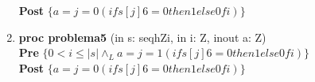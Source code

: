 \documentclass[a4paper]{article}
\begin{document}
\begin{enumerate}[label=\alph*)]
{   \hspace*{6mm} \textbf{Post }$\{a = j=0 (if s[j] 6= 0 then 1 else 0 fi)\}$\\
   }

\item \textbf{proc problema5 }(in s: seqhZi, in i: Z, inout a: Z) {\\
                                  
    \hspace*{6mm} \textbf{Pre }$\{0 < i \leq |s| \wedge_L a = j=1 (if s[j] 6= 0 
    then 1 else 0 fi)\}$\\
                    
   \hspace*{6mm} \textbf{Post }$\{a = j=0 (if s[j] 6= 0 then 1 else 0 fi)\}$\\
   }                     
\end{enumerate}
\end{document}
